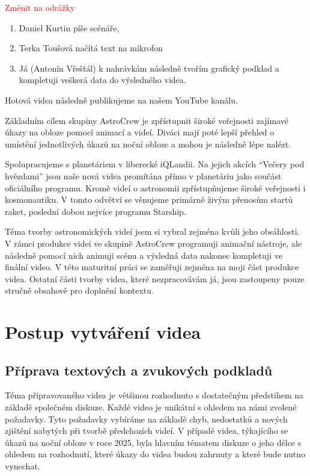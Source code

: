 \documentclass[12pt,a4paper,titlepage]{article}
\begin{document}
\textcolor{red}{Změnit na odrážky}
\begin{enumerate}
	\item Daniel Kurtin píše scénáře,
	\item Terka Toušová načítá text na mikrofon
	\item Já (Antonín Vřešťál) k nahrávkám následně tvořím grafický podklad a kompletuji veškerá data do výsledného videa.
\end{enumerate}
Hotová videa následně publikujeme na našem YouTube kanálu. 

Základním cílem skupiny AstroCrew je zpřístupnit široké veřejnosti zajímavé úkazy na obloze pomocí animací a videí. Diváci mají poté lepší přehled o umístění jednotlivých úkazů na noční obloze a mohou je následně lépe nalézt.

Spolupracujeme s planetáriem v liberecké iQLandii. Na jejich akcích \enquote{Večery pod hvězdami} jsou naše nová videa promítána přímo v planetáriu jako součást oficiálního programu. Kromě videí o astronomii zpřístupňujeme široké veřejnosti i kosmonautiku. V tomto odvětví se věnujeme primárně živým přenosům startů raket, poslední dobou nejvíce programu Starship.

Téma tvorby astronomických videí jsem si vybral zejména kvůli jeho obsáhlosti. V rámci produkce videí ve skupině AstroCrew programuji animační nástroje, ale následně pomocí nich animuji scénu a výsledná data nakonec kompletuji ve finální video. V této maturitní práci se zaměřuji zejména na moji část produkce videa. Ostatní části tvorby videa, které nezpracovávám já, jsou zastoupeny pouze stručně obsahově pro doplnění kontextu. 
\section{Postup vytváření videa}\label{makingof}
\subsection{Příprava textových a zvukových podkladů}\label{makingof:text-audio-prep}
Téma připravovaného videa je většinou rozhodnuto s dostatečným předstihem na základě společném diskuze. Každé video je unikátní s ohledem na námi zvolené požadavky. Tyto požadavky vybíráme na základě chyb, nedostatků a nových zjištění nabytých při tvorbě předchozích videí. V případě videa, týkajícího se úkazů na noční obloze v roce 2025, byla hlavním tématem diskuze o jeho délce s ohledem na rozhodnutí, které úkazy do videa budou zahrnuty a které bude nutno vynechat.
\end{document}
